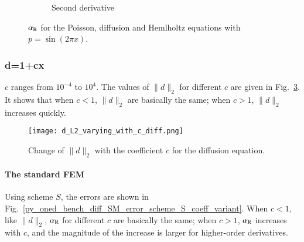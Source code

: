 \documentclass[review,3p]{elsarticle}
\begin{document}
\begin{figure}[!ht]
\begin{subfigure}[b]{0.35\textwidth}
\vspace{-0.2cm}
\caption{Second derivative}
\label{alpha_R_Poisson_p_sin2pix_2_Helmholtz}
\end{subfigure}
\caption{$\alpha_{\rm R}$ for the Poisson, diffusion and Hemlholtz equations with $p=\sin(2\pi x)$.}
\label{alpha_R_Poisson_p_sin2pix_2diff2helm}
\end{figure}

\subsubsection{d=1+cx}

$c$ ranges from $10^{-4}$ to $10^4$. The values of $\|d\|_2$ for different $c$ are given in Fig.~\ref{Fig:d_L2_varying_with_c_diff}.
It shows that when $c<1$, $\|d\|_2$ are basically the same; when $c>1$, $\|d\|_2$ increases quickly.

\begin{figure}[!ht]
\centering
    \texttt{[image: d\_L2\_varying\_with\_c\_diff.png]}
    \caption{Change of $\|d\|_2$ with the coefficient $c$ for the diffusion equation.}
    \label{Fig:d_L2_varying_with_c_diff}   
\end{figure}

\paragraph{The standard FEM}

Using scheme $S$, the errors are shown in Fig.~\ref{py_oned_bench_diff_SM_error_scheme_S_coeff_variant}.
When $c<1$, like $\|d\|_2$, $\alpha_{\rm R}$ for different $c$ are basically the same; when $c>1$, $\alpha_{\rm R}$ increases with $c$, and the magnitude of the increase is larger for higher-order derivatives.
\end{document}
